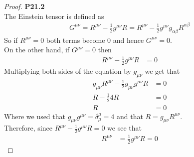 \documentclass[11pt]{article}
\theoremstyle{definition}
\begin{document}
\cleardoublepage
\begin{proof}{\textbf{P21.2}}\\
The Einstein tensor is defined as
\begin{align*}
    G^{\mu\nu} = R^{\mu\nu} - \frac{1}{2}g^{\mu\nu}R
    = R^{\mu\nu} - \frac{1}{2}g^{\mu\nu}g_{\alpha\beta}R^{\alpha\beta}
\end{align*}
So if $R^{\mu\nu} = 0$ both terms become 0 and hence $G^{\mu\nu} = 0$.\\
On the other hand, if $G^{\mu\nu} = 0$ then
\begin{align*}
    R^{\mu\nu} - \frac{1}{2}g^{\mu\nu}R &= 0
\end{align*}
Multiplying both sides of the equation by $g_{\mu\nu}$ we get that
\begin{align*}
    g_{\mu\nu}R^{\mu\nu} - \frac{1}{2}g_{\mu\nu}g^{\mu\nu}R &= 0\\
    R - \frac{1}{2}4R &= 0\\
    R &= 0
\end{align*}
Where we used that $g_{\mu\nu}g^{\mu\nu} = \delta_\mu^\mu = 4$ and that
$R = g_{\mu\nu}R^{\mu\nu}$.\\
Therefore, since $R^{\mu\nu} - \frac{1}{2}g^{\mu\nu}R = 0$ we see that
\begin{align*}
    R^{\mu\nu} &= \frac{1}{2}g^{\mu\nu}R  = 0
\end{align*}
\end{proof}
\end{document}
